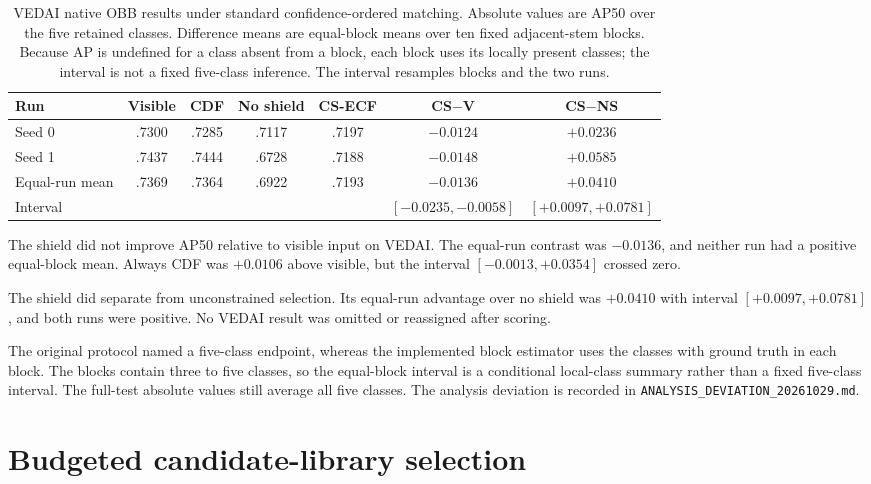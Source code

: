 \documentclass[11pt]{article}
\begin{document}
\begin{table}[ht]
\centering
\small
\setlength{\tabcolsep}{3pt}
\caption{VEDAI native OBB results under standard confidence-ordered matching.
Absolute values are AP50 over the five retained classes. Difference means are
equal-block means over ten fixed adjacent-stem blocks. Because AP is undefined
for a class absent from a block, each block uses its locally present classes;
the interval is not a fixed five-class inference. The interval resamples blocks
and the two runs.}
\label{tab:vedai-supp}
\begin{tabular}{@{}lcccccc@{}}
\toprule
Run & Visible & CDF & No shield & CS-ECF &
CS\(-\)V & CS\(-\)NS \\
\midrule
Seed 0 & .7300 & .7285 & .7117 & .7197 & \(-0.0124\) & \(+0.0236\) \\
Seed 1 & .7437 & .7444 & .6728 & .7188 & \(-0.0148\) & \(+0.0585\) \\
Equal-run mean & .7369 & .7364 & .6922 & .7193 &
\(-0.0136\) & \(+0.0410\) \\
Interval & & & & &
\([-0.0235,-0.0058]\) & \([+0.0097,+0.0781]\) \\
\bottomrule
\end{tabular}
\end{table}

The shield did not improve AP50 relative to visible input on VEDAI. The
equal-run contrast was \(-0.0136\), and neither run had a positive equal-block
mean. Always CDF was \(+0.0106\) above visible, but the interval
\([-0.0013,+0.0354]\) crossed zero.

The shield did separate from unconstrained selection. Its equal-run advantage
over no shield was \(+0.0410\) with interval \([+0.0097,+0.0781]\), and both
runs were positive. No VEDAI result was omitted or reassigned after scoring.

The original protocol named a five-class endpoint, whereas the implemented
block estimator uses the classes with ground truth in each block. The blocks
contain three to five classes, so the equal-block interval is a conditional
local-class summary rather than a fixed five-class interval. The full-test
absolute values still average all five classes. The analysis deviation is
recorded in \texttt{ANALYSIS\_DEVIATION\_20261029.md}.

\section{Budgeted candidate-library selection}
\end{document}
